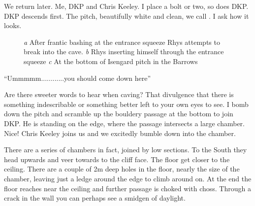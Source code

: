 We return later. Me, DKP and Chris Keeley. I place a bolt or two, so does DKP. DKP descends first. The pitch, beautifully white and clean, we call . I ask how it looks. 

\begin{figure}[t!]
\checkoddpage \ifoddpage \forcerectofloat \else \forceversofloat \fi
\centering
\begin{subfigure}[t]{0.42\textwidth}
\centering
{}
 \caption{}\label{water chamber below helm's deep}
\end{subfigure}
    \hfill
    \begin{subfigure}[t]{0.56\textwidth}
        \centering
        \caption{} \label{HelmsDeep}
    \end{subfigure}
    
    \vspace{0.3cm}
    \begin{subfigure}[t]{\textwidth}
    \centering
        \caption{} \label{Touching the Void}
    \end{subfigure}
    \caption{
    \emph{a} After frantic bashing at the entrance squeeze Rhys attempts to break into the cave.
    \emph{b} Rhys inserting himself through the entrance squeeze
    \emph{c} At the bottom of Isengard pitch in the Barrows}
\end{figure}





“Ummmmm............you should come down here”
 
Are there sweeter words to hear when caving? That divulgence that there is something indescribable or something better left to your own eyes to see. I bomb down the pitch and scramble up the bouldery passage at the bottom to join DKP. He is standing on the edge, where the passage intersects  a large chamber. Nice! Chris Keeley joins us and we excitedly bumble down into the chamber.
 
There are a series of chambers in fact, joined by low sections. To the South they head upwards and veer towards to the cliff face. The floor get closer to the ceiling. There are a couple of 2m deep holes in the floor, nearly the size of the chamber, leaving just a ledge around the edge to climb around on. At the end the floor reaches near the ceiling and further passage is choked with choss. Through a crack in the wall you can perhaps see a smidgen of daylight.
 

